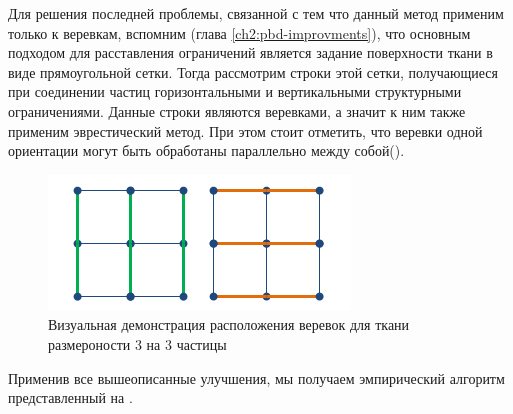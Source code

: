 	Для решения последней проблемы, связанной с тем что данный метод применим только к веревкам, вспомним (глава \ref{ch2:pbd-improvments}), что основным подходом для расставления ограничений является задание поверхности ткани в виде прямоугольной сетки. Тогда рассмотрим строки этой сетки, получающиеся при соединении частиц горизонтальными и вертикальными структурными ограничениями. Данные строки являются веревками, а значит к ним также применим эврестический метод. При этом стоит отметить, что веревки одной ориентации могут быть обработаны параллельно между собой().
	
	\begin{figure}[ht!] 
		\center
		\includegraphics [scale=0.8] {my_folder/images//bending}
		\caption{Визуальная демонстрация расположения веревок для ткани размероности 3 на 3 частицы}
		\label{fig:ropesInCloth}  
	\end{figure}
	
	Применив все вышеописанные улучшения, мы получаем эмпирический алгоритм представленный на .
	
